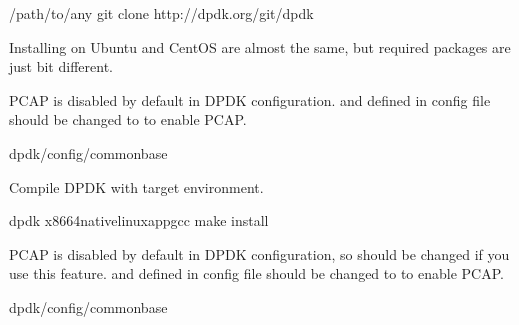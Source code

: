 \documentclass[a4paper,11pt,openany,oneside,english]{sphinxmanual}
\begin{document}
\begin{sphinxVerbatim}[commandchars=\\\{\},formatcom=\footnotesize]
  /path/to/any
 git clone http://dpdk.org/git/dpdk
\end{sphinxVerbatim}

Installing on Ubuntu and CentOS are almost the same, but required packages
are just bit different.

PCAP is disabled by default in DPDK configuration.
 and  defined in
config file  should be changed to  to enable PCAP.

\begin{sphinxVerbatim}[commandchars=\\\{\},formatcom=\footnotesize]
 dpdk/config/common\PYGZus{}base
\end{sphinxVerbatim}

Compile DPDK with target environment.

\begin{sphinxVerbatim}[commandchars=\\\{\},formatcom=\footnotesize]
  dpdk
  
  x86\PYGZus{}64\PYGZhy{}native\PYGZhy{}linuxapp\PYGZhy{}gcc  
 make install 
\end{sphinxVerbatim}

PCAP is disabled by default in DPDK configuration, so should be changed
if you use this feature.
 and  defined in
config file  should be changed to  to enable PCAP.

\begin{sphinxVerbatim}[commandchars=\\\{\},formatcom=\footnotesize]
 dpdk/config/common\PYGZus{}base
\end{sphinxVerbatim}
\end{document}
